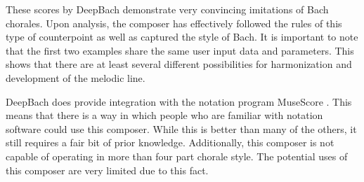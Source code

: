 \pagebreak

These scores by DeepBach demonstrate very convincing imitations of Bach chorales.  Upon analysis, the composer has effectively followed the rules of this type of counterpoint as well as captured the style of Bach.  It is important to note that the first two examples share the same user input data and parameters.  This shows that there are at least several different possibilities for harmonization and development of the melodic line.

\vspace{\baselineskip}

DeepBach does provide integration with the notation program MuseScore \cite{Hadjeres_2016}.  This means that there is a way in which people who are familiar with notation software could use this composer.  While this is better than many of the others, it still requires a fair bit of prior knowledge.  Additionally, this composer is not capable of operating in more than four part chorale style.  The potential uses of this composer are very limited due to this fact.